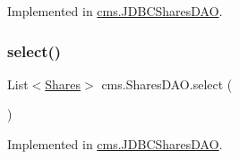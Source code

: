 Implemented in \mbox{\hyperlink{classcms_1_1_j_d_b_c_shares_d_a_o_a085c86e21861e14636c1e213ee522cbd}{cms.\+J\+D\+B\+C\+Shares\+D\+AO}}.

\mbox{\label{interfacecms_1_1_shares_d_a_o_ae7aa2a885c92a0d965d434e090d248ee}} 
\subsubsection{\texorpdfstring{select()}{select()}}
{\footnotesize\ttfamily List$<$\mbox{\hyperlink{classcms_1_1_shares}{Shares}}$>$ cms.\+Shares\+D\+A\+O.\+select (\begin{DoxyParamCaption}{ }\end{DoxyParamCaption})}



Implemented in \mbox{\hyperlink{classcms_1_1_j_d_b_c_shares_d_a_o_a0413a9f3a13a2939aa617d0c55a33e46}{cms.\+J\+D\+B\+C\+Shares\+D\+AO}}.

